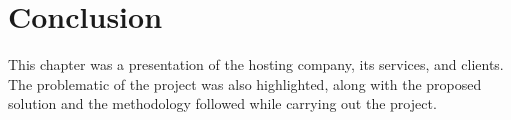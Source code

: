 \documentclass[12pt]{article}
\begin{document}
	\section{Conclusion}
	This chapter was a presentation of the hosting company, its services, and clients. The problematic of the project was also highlighted, along with the proposed solution and the methodology followed while carrying out the project.
	
	 
\end{document}
